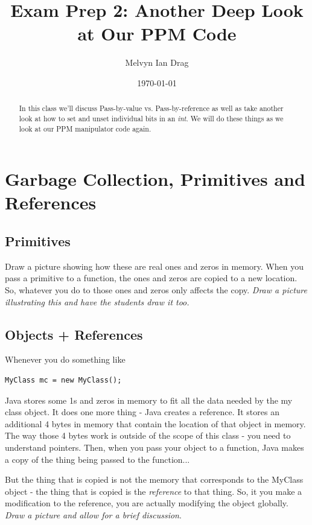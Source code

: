 \documentclass[12pt]{article}
\title{\textbf{Exam Prep 2:} Another Deep Look at Our PPM Code}
\author{
	Melvyn Ian Drag
}
\date{\today}
\begin{document}
\maketitle

\begin{abstract}
In this class we'll discuss Pass-by-value vs. Pass-by-reference as well as take another look at how to set and unset individual bits in an \textit{int}. We will do these things as we look at our PPM manipulator code again.
\end{abstract}

\section{Garbage Collection, Primitives and References}
\subsection{Primitives}
Draw a picture showing how these are real ones and zeros in memory. When you pass a primitive to a function, the ones and zeros are copied to a new location. So, whatever you do to those ones and zeros only affects the copy. \textit{Draw a picture illustrating this and have the students draw it too.}

\subsection{Objects + References}
Whenever you do something like

\begin{lstlisting}
MyClass mc = new MyClass();
\end{lstlisting}

Java stores some 1s and zeros in memory to fit all the data needed by the my class object. It does one more thing - Java creates a reference. It stores an additional 4 bytes in memory that contain the location of that object in memory. The way those 4 bytes work is outside of the scope of this class - you need to understand pointers. Then, when you pass your object to a function, Java makes a copy of the thing being passed to the function...

But the thing that is copied is not the memory that corresponds to the MyClass object - the thing that is copied is the \textit{reference} to that thing. So, it you make a modification to the reference, you are actually modifying the object globally. \textit{Draw a picture and allow for a brief discussion}.
\end{document}
